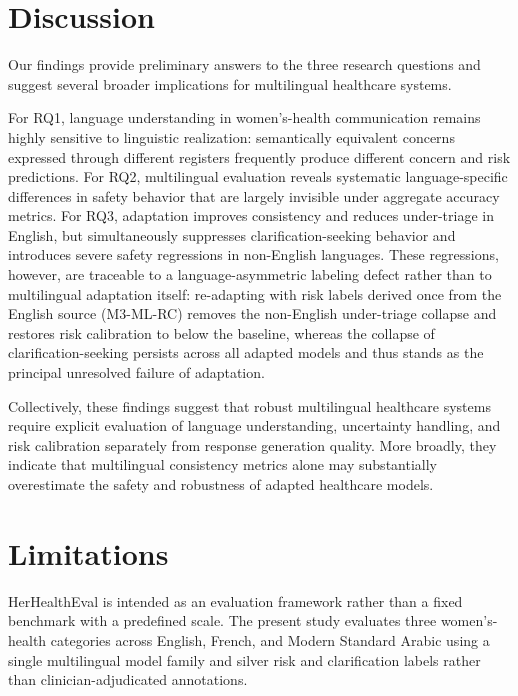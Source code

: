\section{Discussion}
\label{sec:discussion}

Our findings provide preliminary answers to the three research questions and suggest several broader implications for multilingual healthcare systems.

For RQ1, language understanding in women's-health communication remains highly sensitive to linguistic realization: semantically equivalent concerns expressed through different registers frequently produce different concern and risk predictions. For RQ2, multilingual evaluation reveals systematic language-specific differences in safety behavior that are largely invisible under aggregate accuracy metrics. For RQ3, adaptation improves consistency and reduces under-triage in English, but simultaneously suppresses clarification-seeking behavior and introduces severe safety regressions in non-English languages. These regressions, however, are traceable to a language-asymmetric labeling defect rather than to multilingual adaptation itself: re-adapting with risk labels derived once from the English source (M3-ML-RC) removes the non-English under-triage collapse and restores risk calibration to below the baseline, whereas the collapse of clarification-seeking persists across all adapted models and thus stands as the principal unresolved failure of adaptation.

Collectively, these findings suggest that robust multilingual healthcare systems require explicit evaluation of language understanding, uncertainty handling, and risk calibration separately from response generation quality. More broadly, they indicate that multilingual consistency metrics alone may substantially overestimate the safety and robustness of adapted healthcare models.

\section*{Limitations}
\label{sec:limitations}

HerHealthEval is intended as an evaluation framework rather than a fixed benchmark with a predefined scale. The present study evaluates three women's-health categories across English, French, and Modern Standard Arabic using a single multilingual model family and silver risk and clarification labels rather than clinician-adjudicated annotations.

